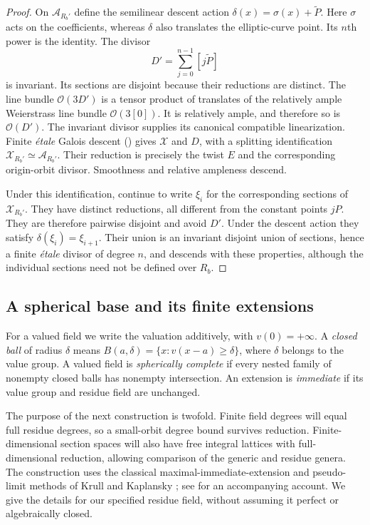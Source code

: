 \begin{proof}
On $\mathcal A_{R_b'}$ define the semilinear descent action
$\delta(x)=\sigma(x)+\widetilde P$. Here $\sigma$ acts on the
coefficients, whereas $\delta$ also translates the elliptic-curve point.
Its $n$th power is the identity.
The divisor
\[
                    D'=\sum_{j=0}^{n-1}[j\widetilde P]
\]
is invariant.  Its sections are disjoint because their reductions are
distinct.  The line bundle $\mathcal O(3D')$ is a tensor product of
translates of the relatively ample Weierstrass line bundle
$\mathcal O(3[0])$.  It is relatively ample, and therefore so is
$\mathcal O(D')$.  The invariant divisor supplies its canonical
compatible linearization.  Finite \emph{\'{e}tale} Galois descent
() gives $\mathcal X$ and $D$, with a splitting
identification $\mathcal X_{R_b'}\simeq\mathcal A_{R_b'}$.
Their reduction is precisely the twist $E$ and the corresponding
origin-orbit divisor.  Smoothness and relative ampleness descend.

Under this identification, continue to write $\xi_i$ for the corresponding
sections of $\mathcal X_{R_b'}$. They have distinct reductions, all different
from the constant points $jP$.  They are therefore pairwise disjoint and
avoid $D'$. Under the descent action they satisfy
$\delta(\xi_i)=\xi_{i+1}$. Their union is an invariant
disjoint union of sections, hence a finite \emph{\'{e}tale} divisor of
degree $n$, and descends with these properties, although the individual
sections need not be defined over $R_b$.
\end{proof}

\subsection{A spherical base and its finite extensions}

For a valued field we write the valuation additively, with
$v(0)=+\infty$.  A \emph{closed ball} of radius $\delta$ means
$B(a,\delta)=\{x:v(x-a)\geq\delta\}$, where $\delta$ belongs to the
value group.  A valued field is \emph{spherically complete} if every
nested family of nonempty closed balls has nonempty intersection.
An extension is \emph{immediate} if its value group and residue field
are unchanged.

The purpose of the next construction is twofold. Finite field degrees
will equal full residue degrees, so a small-orbit degree bound survives
reduction. Finite-dimensional section spaces will also have free
integral lattices with full-dimensional reduction, allowing comparison
of the generic and residue genera. The construction uses the classical
maximal-immediate-extension and pseudo-limit methods of Krull and
Kaplansky \cite{Krull1932,Kaplansky1942}; see
\cite[Section~5]{Poonen1993} for an accompanying account. We give the
details for our specified residue field, without assuming it perfect
or algebraically closed.

